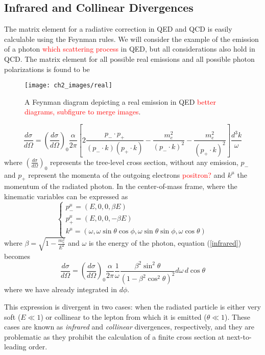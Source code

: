 \documentclass[10pt,a4paper]{book}
\newcommand\todo[1]{\textcolor{red}{#1}}
\begin{document}
\subsection{Infrared and Collinear Divergences}
The matrix element for a radiative correction in QED and QCD is easily calculable using the Feynman rules. We will consider the example of the emission of a photon \todo{which scattering process} in QED, but all considerations also hold in QCD. The matrix element for all possible real emissions and all possible photon polarizations is found to be
\begin{figure}
\centering
\texttt{[image: ch2\_images/real]}
\caption{A Feynman diagram depicting a real emission in QED \todo{better diagrams, subfigure to merge images}.}
\label{real}
\end{figure}
\begin{equation}
\frac{d\sigma}{d\Omega} = \left(\frac{d\sigma}{d\Omega} \right)_0 \frac{\alpha}{2\pi}\left[2\frac{p_- \cdot p_+}{(p_-\cdot k) (p_+ \cdot k)} - \frac{m_e^2}{(p_-\cdot k)^2} - \frac{m_e^2}{(p_+ \cdot k)^2} \right]\frac{d^3k}{\omega}
\label{infrared}
\end{equation}
where $\left(\frac{d\sigma}{d\Omega} \right)_0$ represents the tree-level cross section, without any emission, $p_-$ and $p_+$ represent the momenta of the outgoing electrons \todo{positron?} and $k^\mu$ the momentum of the radiated photon. In the center-of-mass frame, where the kinematic variables can be expressed as
\begin{equation}
\begin{cases}
p_-^\mu = (E, 0, 0, \beta E)\\
p_+^\mu = (E, 0, 0, -\beta E)\\
k^\mu = (\omega, \omega \sin\theta\cos\phi, \omega\sin\theta\sin\phi, \omega\cos\theta)
\end{cases}
\end{equation}
where $\beta = \sqrt{1 - \frac{m_e^2}{E^2}}$ and $\omega$ is the energy of the photon, equation (\ref{infrared}) becomes
\begin{equation}
\frac{d\sigma}{d\Omega} = \left(\frac{d\sigma}{d\Omega} \right)_0 \frac{\alpha}{2\pi}\frac{1}{\omega}\frac{\beta^2\sin^2\theta}{(1-\beta^2\cos^2\theta)^2}d\omega \, d\cos\theta
\end{equation}
where we have already integrated in $d\phi$.

This expression is divergent in two cases: when the radiated particle is either very soft ($E \ll 1$) or collinear to the lepton from which it is emitted ($\theta \ll 1$). These cases are known as \emph{infrared} and \emph{collinear} divergences, respectively, and they are problematic as they prohibit the calculation of a finite cross section at next-to-leading order. 
\end{document}
